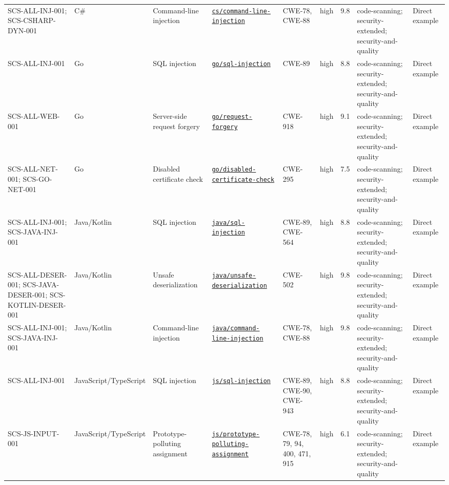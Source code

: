 \documentclass[10pt,letterpaper]{article}
\newcommand{\code}[1]{\begingroup\small\ttfamily\def\UrlFont{\ttfamily}\nolinkurl{#1}\endgroup}
\begin{document}
\begin{landscape}
\begin{longtable}{@{}P{0.95in}P{0.85in}P{1.2in}P{1.55in}P{0.75in}P{0.45in}P{0.45in}P{1.5in}P{0.7in}@{}}
SCS-ALL-INJ-001; SCS-CSHARP-DYN-001 & C\# & Command-line injection & \href{https://codeql.github.com/codeql-query-help/csharp/cs-command-line-injection/}{\code{cs/command-line-injection}} & CWE-78, CWE-88 & high & 9.8 & code-scanning; security-extended; security-and-quality & Direct example\\
SCS-ALL-INJ-001 & Go & SQL injection & \href{https://codeql.github.com/codeql-query-help/go/go-sql-injection/}{\code{go/sql-injection}} & CWE-89 & high & 8.8 & code-scanning; security-extended; security-and-quality & Direct example\\
SCS-ALL-WEB-001 & Go & Server-side request forgery & \href{https://codeql.github.com/codeql-query-help/go/go-request-forgery/}{\code{go/request-forgery}} & CWE-918 & high & 9.1 & code-scanning; security-extended; security-and-quality & Direct example\\
SCS-ALL-NET-001; SCS-GO-NET-001 & Go & Disabled certificate check & \href{https://codeql.github.com/codeql-query-help/go/go-disabled-certificate-check/}{\code{go/disabled-certificate-check}} & CWE-295 & high & 7.5 & code-scanning; security-extended; security-and-quality & Direct example\\
SCS-ALL-INJ-001; SCS-JAVA-INJ-001 & Java/Kotlin & SQL injection & \href{https://codeql.github.com/codeql-query-help/java/java-sql-injection/}{\code{java/sql-injection}} & CWE-89, CWE-564 & high & 8.8 & code-scanning; security-extended; security-and-quality & Direct example\\
SCS-ALL-DESER-001; SCS-JAVA-DESER-001; SCS-KOTLIN-DESER-001 & Java/Kotlin & Unsafe deserialization & \href{https://codeql.github.com/codeql-query-help/java/java-unsafe-deserialization/}{\code{java/unsafe-deserialization}} & CWE-502 & high & 9.8 & code-scanning; security-extended; security-and-quality & Direct example\\
SCS-ALL-INJ-001; SCS-JAVA-INJ-001 & Java/Kotlin & Command-line injection & \href{https://codeql.github.com/codeql-query-help/java/java-command-line-injection/}{\code{java/command-line-injection}} & CWE-78, CWE-88 & high & 9.8 & code-scanning; security-extended; security-and-quality & Direct example\\
SCS-ALL-INJ-001 & JavaScript/\allowbreak TypeScript & SQL injection & \href{https://codeql.github.com/codeql-query-help/javascript/js-sql-injection/}{\code{js/sql-injection}} & CWE-89, CWE-90, CWE-943 & high & 8.8 & code-scanning; security-extended; security-and-quality & Direct example\\
SCS-JS-INPUT-001 & JavaScript/\allowbreak TypeScript & Prototype-polluting assignment & \href{https://codeql.github.com/codeql-query-help/javascript/js-prototype-polluting-assignment/}{\code{js/prototype-polluting-assignment}} & CWE-78, 79, 94, 400, 471, 915 & high & 6.1 & code-scanning; security-extended; security-and-quality & Direct example\\

\end{longtable}
\end{landscape}
\end{document}
